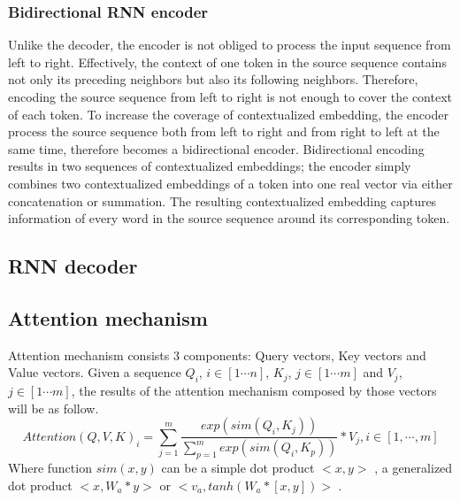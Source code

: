 \subsubsection{Bidirectional RNN encoder}
Unlike the decoder, the encoder is not obliged to process the input sequence from left to right. Effectively, the context of one token in the source sequence contains not only its preceding neighbors but also its following neighbors. Therefore, encoding the source sequence from left to right is not enough to cover the context of each token. To increase the coverage of contextualized embedding, the encoder process the source sequence both from left to right and from right to left at the same time, therefore becomes a bidirectional encoder. Bidirectional encoding results in two sequences of contextualized embeddings; the encoder simply combines two contextualized embeddings of a token into one real vector via either concatenation or summation. The resulting contextualized embedding captures information of every word in the source sequence around its corresponding token. 
\subsection{RNN decoder}
\subsection{Attention mechanism \label{ssec:attention}}
Attention mechanism consists 3 components: Query vectors, Key vectors and Value vectors. Given a sequence $Q_i$, $i \in [1 \cdots n]$, $K_j$, $j \in [1 \cdots m]$ and $V_j$, $j \in [1 \cdots m]$, the results
of the attention mechanism composed by those vectors will be as follow.
\begin{equation}
Attention(Q,V,K)_i = \displaystyle{\mathop{\sum}_{j=1}^{m}} \frac{exp(sim(Q_i,K_j))}{\displaystyle{\mathop{\sum}_{p=1}^{m}}exp(sim(Q_i,K_p))}*V_j, i \in [1, \cdots, m]
\end{equation}
Where function $sim(x,y)$ can be a simple dot product $<x,y>$ \citep{Vaswani17attention}, a generalized dot product $<x,W_a*y>$ or $<v_a,tanh(W_a*[x,y])>$ \citep{Luong15stanford, Bahdanau15learning}.


